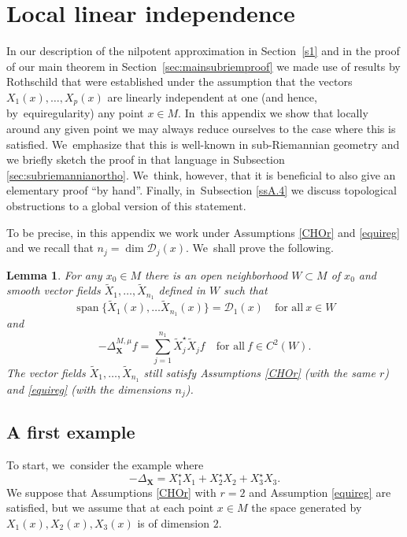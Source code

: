 \documentclass[11pt]{article}
\DeclareMathOperator{\Span}{span}
\newcommand{\bX}{{\boldsymbol{X}}}
\newtheorem{lemma}[theorem]{Lemma}
\theoremstyle{definition}
\let\Xb\bX
\newcommand{\1}{\mathbbm{1}}
\numberwithin{equation}{section}
\begin{document}
\section{Local linear independence}\label{AppA2}

In our description of the nilpotent approximation in Section~\ref{s1} and in the proof of our main theorem in Section~\ref{sec:mainsubriemproof} we made use of results by Rothschild \cite{Rot} that were established under the assumption that the vectors $X_1(x),\ldots,X_p(x)$ are linearly independent at one (and hence, by~equiregularity) any point $x\in M$. In~this appendix we show that locally around any given point we may always reduce ourselves to the case where this is satisfied. We~emphasize that this is well-known in sub-Riemannian geometry and we briefly sketch the proof in that language in Subsection \ref{sec:subriemannianortho}. We~think, however, that it is beneficial to also give an elementary proof ``by hand''. Finally, in~Subsection \ref{ssA.4} we discuss topological obstructions to a global version of this statement.

To be precise, in this appendix we work under Assumptions \ref{CHOr} and \ref{equireg} and we recall that $n_j=\dim\mathcal D_j(x)$. We~shall prove the following.

\begin{lemma}\label{locindep}
For any $x_0\in M$ there is an open neighborhood $W\subset M$ of $x_0$ and smooth vector fields $\tilde X_1,\ldots,\tilde X_{n_1}$ defined in $W$ such that
\begin{equation}
\label{eq:loclinindepapp}
\Span\{ \tilde X_1(x),\ldots \tilde X_{n_1}(x) \} = \mathcal D_1(x)
\quad\text{for all}\ x\in W
\end{equation}
and
\[
-\Delta_\bX^{M,\mu} f = \sum_{j=1}^{n_1} \tilde X_j^\star \tilde X_j f
\quad\text{for all} \ f\in C^2(W).
\]
The vector fields $\tilde X_1,\ldots,\tilde X_{n_1}$ still satisfy Assumptions \ref{CHOr} (with the same $r$) and \ref{equireg} (with the dimensions $n_j$).
\end{lemma}

\subsection{A first example}
To start, we~consider the example where
\[
-\Delta_\Xb = X_1^\star X_1 + X_2^\star X_2 + X_3^\star X_3.
\]
We suppose that Assumptions \ref{CHOr} with $r=2$ and Assumption \ref{equireg} are satisfied, but we assume that at each point $x\in M$ the space generated by $X_1(x), X_2(x), X_3(x)$ is of dimension $2$.
\end{document}
